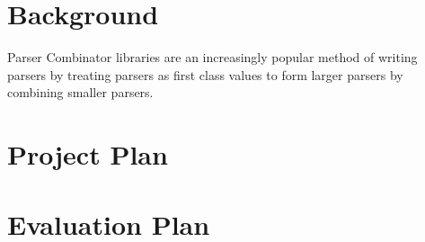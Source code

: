 \documentclass{article}
\begin{document}
\section{Background} %
Parser Combinator libraries are an increasingly popular method of writing parsers by treating parsers as first class values to form larger parsers by
combining smaller parsers.

\section{Project Plan} %

\section{Evaluation Plan} %


\raggedright

\end{document}
